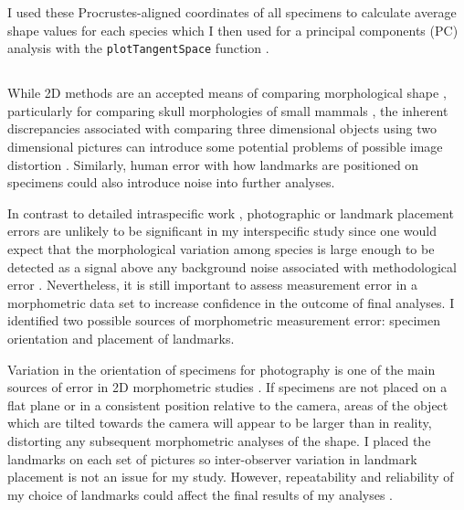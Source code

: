 	I used these Procrustes-aligned coordinates of all specimens to calculate average shape values for each species which I then used for a principal components (PC) analysis with the \texttt{plotTangentSpace} function \citep{Adams2013}. 
	

\subsection{}
	 
	While 2D methods are an accepted means of comparing morphological shape \citep[e.g.][]{Adams2004, Mitteroecker2009}, particularly for comparing skull morphologies of small mammals \citep[e.g.][]{Cardini2003, Panchetti2008, White2008, Barrow2008, Scalici2011}, the inherent discrepancies associated with comparing three dimensional objects using two dimensional pictures can introduce some potential problems of possible image distortion \citep{Arnqvist1998}. Similarly, human error with how landmarks are positioned on specimens could also introduce noise into further analyses. 
	
	In contrast to detailed intraspecific work \citep[e.g.][]{Bornholdt2008, Blagojevic2011}, photographic or landmark placement errors are unlikely to be significant in my interspecific study since one would expect that the morphological variation among species is large enough to  be detected as a signal above any background noise associated with methodological error \citep{Arnqvist1998}. Nevertheless, it is still important to assess measurement error in a morphometric data set to increase confidence in the outcome of final analyses.
	I identified two possible sources of morphometric measurement error: specimen orientation and placement of landmarks.

	Variation in the orientation of specimens for photography is one of the main sources of error in 2D morphometric studies \citep{Adriaens2007}. If specimens are not placed on a flat plane or in a consistent position relative to the camera, areas of the object which are tilted towards the camera will appear to be larger than in reality, distorting any subsequent morphometric analyses of the shape. 
	I placed the landmarks on each set of pictures so inter-observer variation in landmark placement is not an issue for my study.  However, repeatability and reliability of my choice of landmarks could affect the final results of my analyses \citep{Arnqvist1998}.


